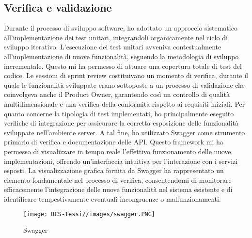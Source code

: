         \subsection{Verifica e validazione}
        Durante il processo di sviluppo software, ho adottato un approccio sistematico all'implementazione dei test unitari, integrandoli organicamente nel ciclo di sviluppo iterativo. L'esecuzione dei test unitari avveniva contestualmente all'implementazione di nuove funzionalità, seguendo la metodologia di sviluppo incrementale. Questo mi ha permesso di attuare una copertura totale di test del codice.
Le sessioni di sprint review costituivano un momento di verifica, durante il quale le funzionalità sviluppate erano sottoposte a un processo di validazione che coinvolgeva anche il Product Owner, garantendo così un controllo di qualità multidimensionale e una verifica della conformità rispetto ai requisiti iniziali.
Per quanto concerne la tipologia di test implementati, ho principalmente eseguito verifiche di integrazione per assicurare la corretta esposizione delle funzionalità sviluppate nell'ambiente server. A tal fine, ho utilizzato Swagger come strumento primario di verifica e documentazione delle API. Questo framework mi ha permesso di visualizzare in tempo reale l'effettivo funzionamento delle nuove implementazioni, offrendo un'interfaccia intuitiva per l'interazione con i servizi esposti.
La visualizzazione grafica fornita da Swagger ha rappresentato un elemento fondamentale nel processo di verifica, consentendomi di monitorare efficacemente l'integrazione delle nuove funzionalità nel sistema esistente e di identificare tempestivamente eventuali incongruenze o malfunzionamenti. 
\begin{figure}[H]
    \centering
    \texttt{[image: BCS-Tessi//images/swagger.PNG]}
    \caption{Swagger}
    \label{fig:swagger}
\end{figure}

